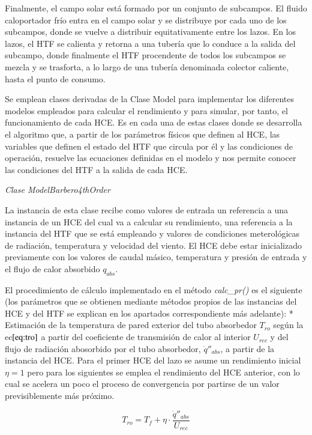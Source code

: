 \documentclass[12pt]{report} %
\begin{document}
Finalmente, el campo solar está formado por un conjunto de subcampos. El fluido caloportador frío entra en el campo solar y se distribuye por cada uno de los subcampos, donde se vuelve a distribuir equitativamente entre los lazos. En los lazos, el HTF se calienta y retorna a una tubería que lo conduce a la salida del subcampo, donde finalmente el HTF procendente de todos los subcampos se mezcla y se trasforta, a lo largo de una tubería denominada colector caliente, hasta el punto de consumo.

Se emplean clases derivadas de la Clase Model para implementar los diferentes modelos empleados para calcular el rendimiento y para simular, por tanto, el funcionamiento de cada HCE. Es en cada una de estas clases donde se desarrolla el algoritmo que, a partir de los parámetros físicos que definen al HCE, las variables que definen el estado del HTF que circula por él y las condiciones de operación, resuelve las ecuaciones definidas en el modelo y nos permite conocer las
condiciones del HTF a la salida de cada HCE.

\emph{Clase ModelBarbero4thOrder}

La instancia de esta clase recibe como valores de entrada un referencia a una instancia de un HCE del cual va a calcular su rendimiento, una referencia a la instancia del HTF que se está empleando y valores de condiciones meterológicas de radiación, temperatura y velocidad del viento. El HCE debe estar inicializado previamente con los valores de caudal másico, temperatura y presión de entrada y el flujo de calor absorbido \(q_{abs}\).

El procedimiento de cálculo implementado en el método \emph{calc\_pr()} es el siguiente (los parámetros que se obtienen mediante métodos propios de las instancias del HCE y del HTF se explican en los apartados correspondiente más adelante): * Estimación de la temperatura de pared exterior del tubo absorbedor \(T_{ro}\) según la ec\(\eqref{eq:tro}\) a partir del coeficiente de transmisión de calor al interior \(U_{rec}\) y del flujo de radiación abosorbido por el tubo absorbedor, \(\dot q''_{abs}\), a partir de la instancia del HCE. Para el primer HCE del lazo se asume un rendimiento inicial \(\eta=1\) pero para los siguientes se emplea el rendimiento del HCE anterior, con lo cual se acelera un poco el proceso de convergencia por partirse de un valor previsiblemente más próximo.

\begin{equation}
    T_{ro} = T_f + \eta \cdot \frac{\dot q''_{abs}}{U_{rec}}
    \label{eq:tro}
\end{equation}
\end{document}
